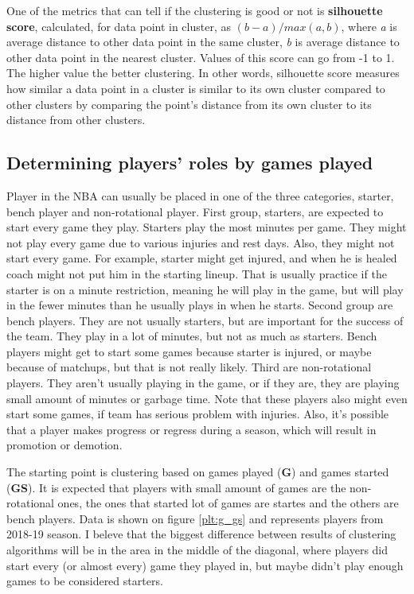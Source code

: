 \documentclass[a4paper]{article}
\begin{document}
One of the metrics that can tell if the clustering is good or not is \textbf{silhouette score}, calculated, for data point in cluster, as $ (b - a)  / max(a, b) $, where \textit{a} is average distance to other data point in the same cluster, \textit{b} is average distance to other data point in the nearest cluster. Values of this score can go from -1 to 1. The higher value the better clustering. In other words, silhouette score measures how similar a data point in a cluster is similar to its own cluster compared to other clusters by comparing the point’s distance from its own cluster to its distance from other clusters. \cite{clustering}

\subsection{Determining players' roles by games played}
\label{subsec:players_roles}

Player in the NBA can usually be placed in one of the three categories, starter, bench player and non-rotational player. First group, starters, are expected to start every game they play. Starters play the most minutes per game. They might not play every game due to various injuries and rest days. Also, they might not start every game. For example, starter might get injured, and when he is healed coach might not put him in the starting lineup. That is usually practice if the starter is on a minute restriction, meaning he will play in the game, but will play in the fewer minutes than he usually plays in when he starts. Second group are bench players. They are not usually starters, but are important for the success of the team. They play in a lot of minutes, but not as much as starters. Bench players might get to start some games because starter is injured, or maybe because of matchups, but that is not really likely. Third are non-rotational players. They aren't usually playing in the game, or if they are, they are playing small amount of minutes or garbage time. Note that these players also might even start some games, if team has serious problem with injuries. Also, it's possible that a player makes progress or regress during a season, which will result in promotion or demotion.

The starting point is clustering based on games played (\textbf{G}) and games started (\textbf{GS}). It is expected that players with small amount of games are the non-rotational ones, the ones that started lot of games are startes and the others are bench players. Data is shown on figure \ref{plt:g_gs} and represents players from 2018-19 season. I beleve that the biggest difference between results of clustering algorithms will be in the area in the middle of the diagonal, where players did start every (or almost every) game they played in, but maybe didn't play enough games to be considered starters.
\end{document}
